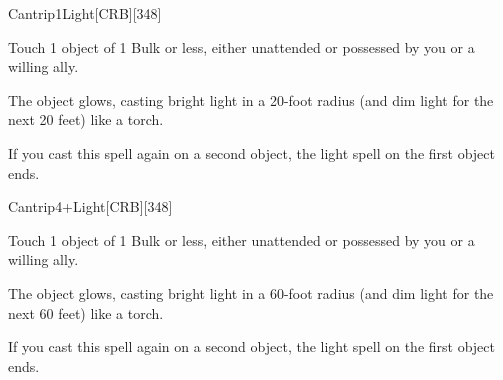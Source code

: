 
\begin{card}{Cantrip}{1}{Light}[CRB][348]




Touch 1 object of 1 Bulk or less, either unattended or possessed by you or a willing ally.

The object glows, casting bright light in a 20-foot radius (and dim light for the next 20 feet) like a torch.

If you cast this spell again on a second object, the light spell on the first object ends.
\end{card}


\begin{card}{Cantrip}{4+}{Light}[CRB][348]




Touch 1 object of 1 Bulk or less, either unattended or possessed by you or a willing ally.

The object glows, casting bright light in a 60-foot radius (and dim light for the next 60 feet) like a torch.

If you cast this spell again on a second object, the light spell on the first object ends.
\end{card}
